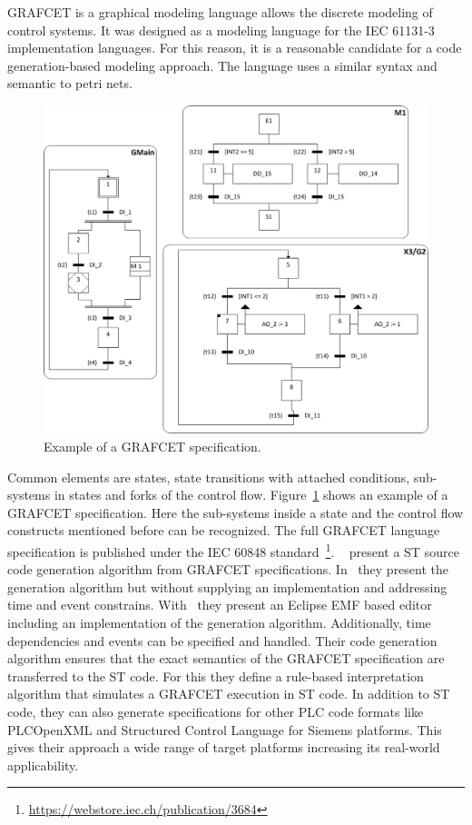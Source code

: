 GRAFCET is a graphical modeling language allows the discrete modeling of control systems.
It was designed as a modeling language for the IEC 61131-3 implementation languages.
For this reason, it is a reasonable candidate for a code generation-based modeling approach.
The language uses a similar syntax and semantic to petri nets.
\begin{figure}[h]
	\includegraphics[width=\textwidth]{./Figures/grafcet_ex.jpg}
	\caption[Example of a GRAFCET specification.]{Example of a GRAFCET specification.~\cite{JULIUS2017173}}
	\label{fig:grafcet}
\end{figure}
Common elements are states, state transitions with attached conditions, sub-systems in states and forks of the control flow.
Figure~\ref{fig:grafcet} shows an example of a GRAFCET specification.
Here the sub-systems inside a state and the control flow constructs mentioned before can be recognized.
The full GRAFCET language specification is published under the IEC 60848 standard~\footnote{\url{https://webstore.iec.ch/publication/3684}}.
\citeauthor{JULIUS20191767}~\cite{JULIUS20191767, JULIUS2017173} present a ST source code generation algorithm from GRAFCET specifications.
In~\cite{JULIUS2017173} they present the generation algorithm but without supplying an implementation and addressing time and event constrains.
With~\cite{JULIUS20191767} they present an Eclipse EMF based editor including an implementation of the generation algorithm.
Additionally, time dependencies and events can be specified and handled.
Their code generation algorithm ensures that the exact semantics of the GRAFCET specification are transferred to the ST code.
For this they define a rule-based interpretation algorithm that simulates a GRAFCET execution in ST code.
In addition to ST code, they can also generate specifications for other PLC code formats like PLCOpenXML and Structured Control Language for Siemens platforms.
This gives their approach a wide range of target platforms increasing its real-world applicability.


